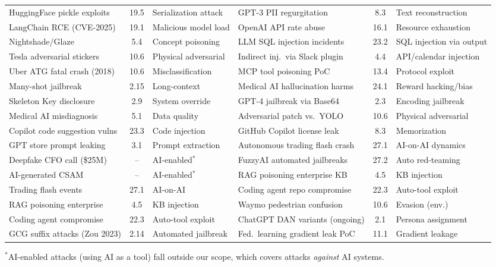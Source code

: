 \documentclass[conference]{IEEEtran}
\begin{document}
\begin{table}[!htbp]
\begin{tabular}{p{3.5cm}cp{3.5cm}|p{3.5cm}cp{3.0cm}}
HuggingFace pickle exploits & 19.5 & Serialization attack & GPT-3 PII regurgitation & 8.3 & Text reconstruction \\
LangChain RCE (CVE-2025) & 19.1 & Malicious model load & OpenAI API rate abuse & 16.1 & Resource exhaustion \\
Nightshade/Glaze & 5.4 & Concept poisoning & LLM SQL injection incidents & 23.2 & SQL injection via output \\
Tesla adversarial stickers & 10.6 & Physical adversarial & Indirect inj.\ via Slack plugin & 4.4 & API/calendar injection \\
Uber ATG fatal crash (2018) & 10.6 & Misclassification & MCP tool poisoning PoC & 13.4 & Protocol exploit \\
Many-shot jailbreak & 2.15 & Long-context & Medical AI hallucination harms & 24.1 & Reward hacking/bias \\
Skeleton Key disclosure & 2.9 & System override & GPT-4 jailbreak via Base64 & 2.3 & Encoding jailbreak \\
Medical AI misdiagnosis & 5.1 & Data quality & Adversarial patch vs.\ YOLO & 10.6 & Physical adversarial \\
Copilot code suggestion vulns & 23.3 & Code injection & GitHub Copilot license leak & 8.3 & Memorization \\
GPT store prompt leaking & 3.1 & Prompt extraction & Autonomous trading flash crash & 27.1 & AI-on-AI dynamics \\
Deepfake CFO call (\$25M) & -- & AI-enabled$^*$ & FuzzyAI automated jailbreaks & 27.2 & Auto red-teaming \\
AI-generated CSAM & -- & AI-enabled$^*$ & RAG poisoning enterprise KB & 4.5 & KB injection \\
Trading flash events & 27.1 & AI-on-AI & Coding agent repo compromise & 22.3 & Auto-tool exploit \\
RAG poisoning enterprise & 4.5 & KB injection & Waymo pedestrian confusion & 10.6 & Evasion (env.) \\
Coding agent compromise & 22.3 & Auto-tool exploit & ChatGPT DAN variants (ongoing) & 2.1 & Persona assignment \\
GCG suffix attacks (Zou 2023) & 2.14 & Automated jailbreak & Fed.\ learning gradient leak PoC & 11.1 & Gradient leakage \\
\bottomrule
\end{tabular}
\begin{tablenotes}
\scriptsize
\item $^*$AI-enabled attacks (using AI as a tool) fall outside our scope, which covers attacks \emph{against} AI systems.
\end{tablenotes}
\end{table}
\end{document}
